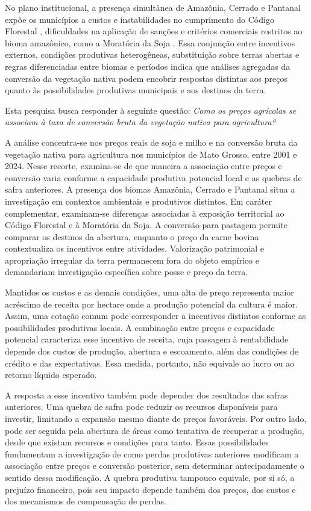 No plano institucional, a presença simultânea de Amazônia, Cerrado e Pantanal expõe os municípios a custos e instabilidades no cumprimento do Código Florestal \cite{SticklerEtAl2013}, dificuldades na aplicação de sanções \cite{Sousa2016} e critérios comerciais restritos ao bioma amazônico, como a Moratória da Soja \cite{HeilmayrEtAl2020}. Essa conjunção entre incentivos externos, condições produtivas heterogêneas, substituição sobre terras abertas e regras diferenciadas entre biomas e períodos indica que análises agregadas da conversão da vegetação nativa podem encobrir respostas distintas aos preços quanto às possibilidades produtivas municipais e aos destinos da terra.

Esta pesquisa busca responder à seguinte questão: \emph{Como os preços agrícolas se associam à taxa de conversão bruta da vegetação nativa para agricultura?}

A análise concentra-se nos preços reais de soja e milho e na conversão bruta da vegetação nativa para agricultura nos municípios de Mato Grosso, entre 2001 e 2024. Nesse recorte, examina-se de que maneira a associação entre preços e conversão varia conforme a capacidade produtiva potencial local e as quebras de safra anteriores. A presença dos biomas Amazônia, Cerrado e Pantanal situa a investigação em contextos ambientais e produtivos distintos. Em caráter complementar, examinam-se diferenças associadas à exposição territorial ao Código Florestal e à Moratória da Soja. A conversão para pastagem permite comparar os destinos da abertura, enquanto o preço da carne bovina contextualiza os incentivos entre atividades. Valorização patrimonial e apropriação irregular da terra permanecem fora do objeto empírico e demandariam investigação específica sobre posse e preço da terra.

Mantidos os custos e as demais condições, uma alta de preço representa maior acréscimo de receita por hectare onde a produção potencial da cultura é maior. Assim, uma cotação comum pode corresponder a incentivos distintos conforme as possibilidades produtivas locais. A combinação entre preços e capacidade potencial caracteriza esse incentivo de receita, cuja passagem à rentabilidade depende dos custos de produção, abertura e escoamento, além das condições de crédito e das expectativas. Essa medida, portanto, não equivale ao lucro ou ao retorno líquido esperado.

A resposta a esse incentivo também pode depender dos resultados das safras anteriores. Uma quebra de safra pode reduzir os recursos disponíveis para investir, limitando a expansão mesmo diante de preços favoráveis. Por outro lado, pode ser seguida pela abertura de áreas como tentativa de recuperar a produção, desde que existam recursos e condições para tanto. Essas possibilidades fundamentam a investigação de como perdas produtivas anteriores modificam a associação entre preços e conversão posterior, sem determinar antecipadamente o sentido dessa modificação. A quebra produtiva tampouco equivale, por si só, a prejuízo financeiro, pois seu impacto depende também dos preços, dos custos e dos mecanismos de compensação de perdas.

